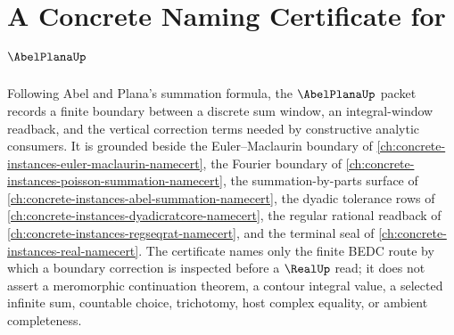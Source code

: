 \chapter{A Concrete Naming Certificate for $\AbelPlanaUp$}
\label{ch:concrete-instances-abel-plana-namecert}

Following Abel and Plana's summation formula, the $\AbelPlanaUp$ packet records a finite boundary between a discrete sum window, an integral-window readback, and the vertical correction terms needed by constructive analytic consumers. It is grounded beside the Euler--Maclaurin boundary of \autoref{ch:concrete-instances-euler-maclaurin-namecert}, the Fourier boundary of \autoref{ch:concrete-instances-poisson-summation-namecert}, the summation-by-parts surface of \autoref{ch:concrete-instances-abel-summation-namecert}, the dyadic tolerance rows of \autoref{ch:concrete-instances-dyadicratcore-namecert}, the regular rational readback of \autoref{ch:concrete-instances-regseqrat-namecert}, and the terminal seal of \autoref{ch:concrete-instances-real-namecert}. The certificate names only the finite BEDC route by which a boundary correction is inspected before a $\RealUp$ read; it does not assert a meromorphic continuation theorem, a contour integral value, a selected infinite sum, countable choice, trichotomy, host complex equality, or ambient completeness.

